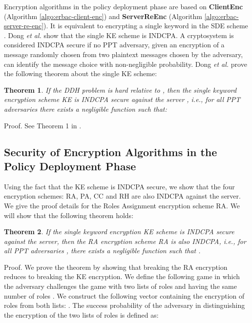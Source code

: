 \documentclass[epsfig,a4paper,11pt,titlepage]{book}
\newtheorem{theorem}{Theorem}
\numberwithin{algorithm}{chapter}
\begin{document}
Encryption algorithms in the policy deployment phase are based on \textbf{ClientEnc} (Algorithm \ref{algo:erbac-client-enc}) and \textbf{ServerReEnc} (Algorithm \ref{algo:erbac-server-re-enc}). It is equivalent to encrypting a single keyword in the \gls{SDE} scheme \cite{Dong:2011}. Dong \emph{et al.} \cite{Dong:2011} show that the single \gls{KE} scheme is \gls{INDCPA}. A cryptosystem is considered \gls{INDCPA} secure if no \gls{PPT} adversary, given an encryption of a message randomly chosen from two plaintext messages chosen by the adversary, can identify the message choice with non-negligible probability. Dong \emph{et al.} \cite{Dong:2011} prove the following theorem about the single \gls{KE} scheme:

\begin{theorem}
If the \gls{DDH} problem is hard relative to , then the single keyword encryption scheme \gls{KE} is \gls{INDCPA} secure against the server , i.e., for all \gls{PPT} adversaries  there exists a negligible function  such that:

\end{theorem}

Proof. See Theorem 1 in \cite{Dong:2011}.

\subsection{Security of Encryption Algorithms in the Policy Deployment Phase}
Using the fact that the \gls{KE} scheme is \gls{INDCPA} secure, we show that the four encryption schemes: \gls{RA}, \gls{PA}, \gls{CC} and \gls{RH} are also \gls{INDCPA} against the server. We give the proof details for the Roles Assignment encryption scheme \gls{RA}. We will show that the following theorem holds:

\begin{theorem}
If the single keyword encryption \gls{KE} scheme is \gls{INDCPA} secure against the server, then the \gls{RA} encryption scheme \gls{RA} is also \gls{INDCPA}, i.e., for all \gls{PPT} adversaries , there exists a negligible function  such that
.
\end{theorem}

Proof. We prove the theorem by showing that breaking the \gls{RA} encryption reduces to breaking the \gls{KE} encryption. We define the following game in which the adversary  challenges the game with two lists of roles  and  having the same number of roles . We construct the following vector containing the encryption of roles from both lists: . The success probability of the adversary in distinguishing the encryption of the two lists of roles is defined as:
\end{document}

